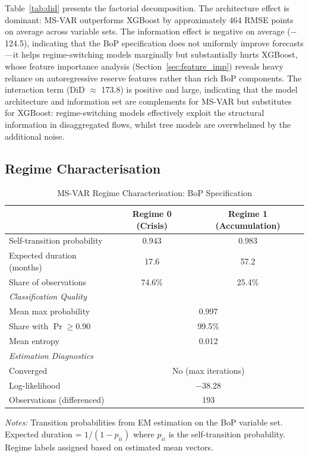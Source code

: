 \documentclass[12pt,a4paper]{article}
\begin{document}
Table~\ref{tab:did} presents the factorial decomposition. The architecture effect is dominant: MS-VAR outperforms XGBoost by approximately 464 RMSE points on average across variable sets. The information effect is negative on average ($-$124.5), indicating that the BoP specification does not uniformly improve forecasts---it helps regime-switching models marginally but substantially hurts XGBoost, whose feature importance analysis (Section~\ref{sec:feature_imp}) reveals heavy reliance on autoregressive reserve features rather than rich BoP components. The interaction term (DiD $\approx$ 173.8) is positive and large, indicating that the model architecture and information set are complements for MS-VAR but substitutes for XGBoost: regime-switching models effectively exploit the structural information in disaggregated flows, whilst tree models are overwhelmed by the additional noise.

\subsection{Regime Characterisation}
\label{sec:regime_char}

\begin{table}[htbp]
\centering
\caption{MS-VAR Regime Characterisation: BoP Specification}
\label{tab:regime_char}
\begin{tabular}{lcc}
\toprule
& Regime 0 (Crisis) & Regime 1 (Accumulation) \\
\midrule
Self-transition probability & 0.943 & 0.983 \\
Expected duration (months) & 17.6 & 57.2 \\
Share of observations & 74.6\% & 25.4\% \\
\midrule
\multicolumn{3}{l}{\textit{Classification Quality}} \\
Mean max probability & \multicolumn{2}{c}{0.997} \\
Share with $\Pr \geq 0.90$ & \multicolumn{2}{c}{99.5\%} \\
Mean entropy & \multicolumn{2}{c}{0.012} \\
\midrule
\multicolumn{3}{l}{\textit{Estimation Diagnostics}} \\
Converged & \multicolumn{2}{c}{No (max iterations)} \\
Log-likelihood & \multicolumn{2}{c}{$-$38.28} \\
Observations (differenced) & \multicolumn{2}{c}{193} \\
\bottomrule
\end{tabular}
\begin{tablenotes}
\small
\item \textit{Notes:} Transition probabilities from EM estimation on the BoP variable set. Expected duration = $1/(1-p_{ii})$ where $p_{ii}$ is the self-transition probability. Regime labels assigned based on estimated mean vectors.
\end{tablenotes}
\end{table}
\end{document}
